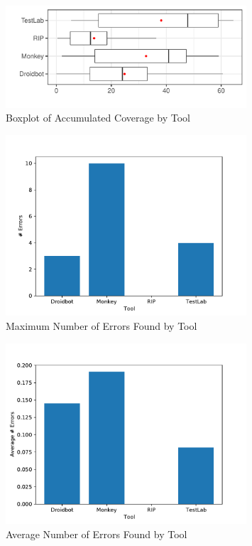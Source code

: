 \begin{figure}[h]
\centering
\includegraphics[width=0.8\textwidth]{../Figures/boxplotAccumulated.pdf}
\caption{Boxplot of Accumulated Coverage by Tool}\label{fig:boxplotAccumulated}
\end{figure}

\begin{figure}[h]
\centering
\includegraphics[width=0.8\textwidth]{../Figures/maxErrors.pdf}
\caption{Maximum Number of Errors Found by Tool}\label{fig:maxerrors}
\end{figure}

\begin{figure}[h]
\centering
\includegraphics[width=0.8\textwidth]{../Figures/averageErrors.pdf}
\caption{Average Number of Errors Found by Tool}\label{fig:averagaerrors}
\end{figure}
